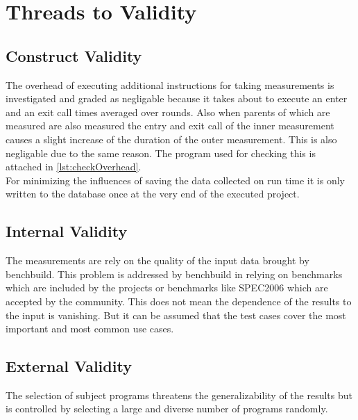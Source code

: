 \section{Threads to Validity}
\subsection{Construct Validity}
The overhead of executing additional instructions for taking measurements is investigated and graded as negligable because it takes about \measurementOverhead to execute an enter and an exit call \overheadIterations times averaged over \overheadRounds rounds.
Also when parents of \scops which are measured are also measured the entry and exit call of the inner measurement causes a slight increase of the duration of the outer measurement.
This is also negligable due to the same reason.
The program used for checking this is attached in \autoref{lst:checkOverhead}.\\
For minimizing the influences of saving the data collected on run time it is only written to the database once at the very end of the executed project.\\
\subsection{Internal Validity}
The measurements are rely on the quality of the input data brought by benchbuild.
This problem is addressed by benchbuild in relying on benchmarks which are included by the projects or benchmarks like SPEC2006 which are accepted by the community.
This does not mean the dependence of the results to the input is vanishing.
But it can be assumed that the test cases cover the most important and most common use cases.
\subsection{External Validity}
The selection of subject programs threatens the generalizability of the results but is controlled by selecting a large and diverse number of programs randomly.
